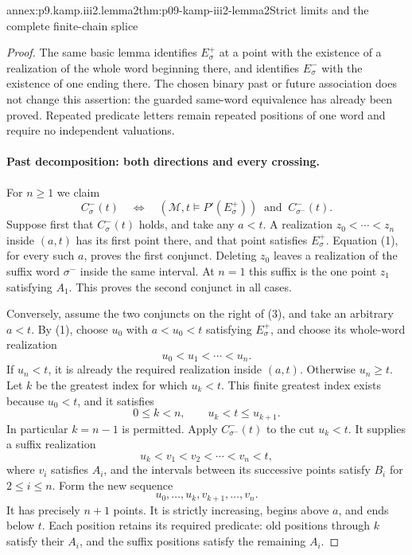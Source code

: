 \begin{annexitem}{annex:p9.kamp.iii2.lemma2}{thm:p09-kamp-iii2-lemma2}{Strict limits and the complete finite-chain splice}
\begin{proof}
The same basic lemma identifies \(E^+_\sigma\) at a point with the
existence of a realization of the whole word beginning there, and identifies
\(E^-_\sigma\) with the existence of one ending there.  The chosen binary
past or future association does not change this assertion: the guarded
same-word equivalence has already been proved.  Repeated predicate letters
remain repeated positions of one word and require no independent valuations.

\paragraph{Past decomposition: both directions and every crossing.}
For \(n\geq1\) we claim
\[
 C^-_\sigma(t)\quad\Longleftrightarrow\quad
  (\mathcal M,t\models P'(E^+_\sigma))\ \text{ and }\
                                    C^-_{\sigma^-}(t).
\tag{3}
\]
Suppose first that \(C^-_\sigma(t)\) holds, and take any \(a<t\).
A realization \(z_0<\cdots<z_n\) inside \((a,t)\) has its first point
there, and that point satisfies \(E^+_\sigma\).  Equation (1), for every
such \(a\), proves the first conjunct.  Deleting \(z_0\) leaves a
realization of the suffix word \(\sigma^-\) inside the same interval.
At \(n=1\) this suffix is the one point \(z_1\) satisfying \(A_1\).
This proves the second conjunct in all cases.

Conversely, assume the two conjuncts on the right of (3), and take an
arbitrary \(a<t\).  By (1), choose \(u_0\) with \(a<u_0<t\)
satisfying \(E^+_\sigma\), and choose its whole-word realization
\[
                     u_0<u_1<\cdots<u_n.
\]
If \(u_n<t\), it is already the required realization inside \((a,t)\).
Otherwise \(u_n\geq t\).  Let \(k\) be the greatest index for which
\(u_k<t\).  This finite greatest index exists because \(u_0<t\), and
it satisfies
\[
             0\leq k<n,\qquad u_k<t\leq u_{k+1}.
\tag{4}
\]
In particular \(k=n-1\) is permitted.  Apply \(C^-_{\sigma^-}(t)\)
to the cut \(u_k<t\).  It supplies a suffix realization
\[
                    u_k<v_1<v_2<\cdots<v_n<t,
\]
where \(v_i\) satisfies \(A_i\), and the intervals between its
successive points satisfy \(B_i\) for \(2\leq i\leq n\).
Form the new sequence
\[
                  u_0,\ldots,u_k,v_{k+1},\ldots,v_n.
\tag{5}
\]
It has precisely \(n+1\) points.  It is strictly increasing, begins
above \(a\), and ends below \(t\).  Each position retains its required
predicate: old positions through \(k\) satisfy their \(A_i\), and
the suffix positions satisfy the remaining \(A_i\).


\end{proof}
\end{annexitem}

